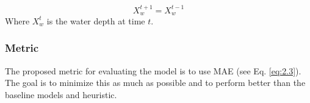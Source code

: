 \begin{equation}
	\label{eq:4.7}
	X_{w}^{t+1} =  X_{w}^{t-1}
\end{equation}
Where $X_{w}^{t}$ is the water depth at time $t$.

\subsubsection*{Metric}
The proposed metric for evaluating the model is to use MAE (see Eq. \ref{eq:2.3}). The goal is to minimize this as much as possible and to perform better than the baseline models and heuristic.